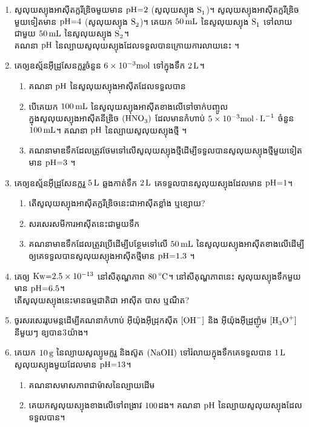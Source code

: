 \documentclass[12pt, a4paper]{article}
\begin{document}
\begin{enumerate}[m]
\begin{enumerate}[k]
	\end{enumerate}
	\item សូលុយស្យុងអាសុីតក្លរីឌ្រិចមួយមាន $\ce{pH=2}$ (សូលុយស្យុង $\ce{S1}$)។ សូលុយស្យុងអាសុីតក្លរីឌ្រិចមួយទៀតមាន $\ce{pH=4}$ (សូលុយស្យុង $\ce{S2}$)។ គេយក $\ce{50mL}$ នៃសូលុយស្យុង $\ce{S1}$ ទៅលាយជាមួយ $\ce{50mL}$ នៃសូលុយស្យុង $\ce{S2}$។\\
	 គណនា $\ce{pH}$ នៃល្បាយសូលុយស្យុងដែលទទួលបានក្រោយការលាយនេះ ។
	 \item គេឲ្យឧស្ម័នអុីដ្រូសែនក្លរួចំនួន $6\times10^{-3}\ce{mol}$ ទៅក្នុងទឹក $\ce{2L}$។
	 \begin{enumerate}[k]
	 	\item គណនា $\ce{pH}$ នៃសូលុយស្យុងអាសុីតដែលទទួលបាន
	 	\item បើគេយក $\ce{100mL}$ នៃសូលុយស្យុងអាសុីតខាងលើទៅចាក់បញ្ចូលក្នុងសូលុយស្យុងអាសុីតនីឌ្រិច $\ce{(HNO3)}$ ដែលមានកំហាប់ $5\times10^{-3}\ce{mol\cdot L^{-1}}$ ចំនួន $\ce{100mL}$។ គណនា $\ce{pH}$ នៃល្បាយសូលុយស្យុងថ្មី ។
	 	\item គណនាមាឌទឹកដែលត្រូវថែមទៅលើសូលុយស្យុងថ្មីដើម្បីទទួលបានសូលុយស្យុងថ្មីមួយទៀតមាន $\ce{pH=3}$ ។
	 \end{enumerate}
 	\item គេឲ្យឧស្ម័នអុីដ្រូសែនក្លរួ $\ce{5L}$ ឆ្លងកាត់ទឹក $\ce{2L}$ គេទទួលបានសូលុយស្យុងដែលមាន $\ce{pH=1}$។
 	\begin{enumerate}[k]
 		\item តើសូលុយស្យុងអាសុីតក្លរីឌ្រិចនេះជាអាសុីតខ្លាំង ឬខ្សោយ?
 		\item សរសេរសមីការអាសុីតនេះជាមួយទឹក
 		\item គណនាមាឌទឹកដែលត្រូវប្រើដើម្បីបន្ថែមទៅលើ $\ce{50mL}$ នៃសូលុយស្យុងអាសុីតខាងលើដើម្បីឲ្យគេទទួលបានសូលុយស្យុងអាសុីតថ្មីមាន $\ce{pH=1.3}$ ។
 	\end{enumerate}
 	\item គេឲ្យ $\ce{Kw=2.5}\times10^{-13}$ នៅសីតុណ្ហភាព $\ce{80^\circ C}$។ នៅសីតុណ្ហភាពនេះ សូលុយស្យុងទឹកមួយមាន $\ce{pH=6.5}$។\\
 	តើសូលុយស្យុងនេះមានធម្មជាតិជា អាសុីត បាស ឬណឺត?
 	\item ចូរសរសេររូបមន្តដើម្បីគណនាកំហាប់ អុីយ៉ុងអុីដ្រុកសុីត $\ce{[OH^-]}$ និង អុីយ៉ុងអុីដ្រូញ៉ូម $\ce{[H3O+]}$ នីមួយៗ ឧ្យបាន$\ce{3}$យ៉ាង។\newpage
 	\item គេយក $\ce{10g}$ នៃល្យាយសូល្យូមក្លរួ និងស៊ូត $\ce{(NaOH)}$ ទៅរំលាយក្នុងទឹកគេទទួលបាន $\ce{1L}$ សូលុយស្យុងមួយដែលមាន $\ce{pH=13}$។
 	\begin{enumerate}[k]
 		\item គណនាសមាសភាពជាម៉ាសនៃល្បាយដើម
 		\item គេយកសូលុយស្យុងខាងលើទៅពង្រាវ $\ce{100}$ដង។ គណនា $\ce{pH}$ នៃល្បាយសូលុយស្យុងដែលទទួលបាន។

\end{enumerate}
\end{enumerate}
\end{document}

